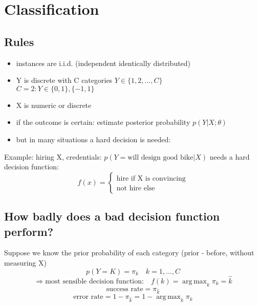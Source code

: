 \documentclass[11pt]{article}
\DeclareMathOperator*{\argmax}{arg\,max}
\begin{document}
  \section{Classification}
    \subsection{Rules}
      \begin{itemize}
        \item instances are i.i.d. (independent identically distributed)
        \item Y is discrete with C categories $Y \in \{ 1, 2,..., C\}$ \\
          $C = 2: Y \in \{ 0, 1\}, \{ -1, 1\}$
        \item X is numeric or discrete
        \item if the outcome is certain: estimate posterior probability $p(Y|X;\theta)$
        \item but in many situations a hard decision is needed:
      \end{itemize}
      Example: hiring X, credentials: $p(Y=\text{will design good bike}|X)$
      needs a hard decision function:
      \begin{equation*}
        f(x) =
        \begin{cases}
          \text{hire if X is convincing}\\
          \text{not hire else}
        \end{cases}
      \end{equation*}
    \subsection{How badly does a bad decision function perform?}
      Suppose we know the prior probability of each category (prior - before,
      without measuring X)
      \begin{equation*}
        p(Y=K) = \pi_{k} \quad k = 1,...,C
      \end{equation*}
      \begin{equation*}
        \Rightarrow \text{most sensible decision function:} \quad f(k) = \argmax_{k} \pi_{k} = \hat{k}
      \end{equation*}
      \begin{equation*}
        \text{success rate} = \pi_{\hat{k}}
      \end{equation*}
      \begin{equation*}
        \text{error rate} = 1 - \pi_{\hat{k}} = 1 - \argmax_{k} \pi_{k}
      \end{equation*}
\end{document}
